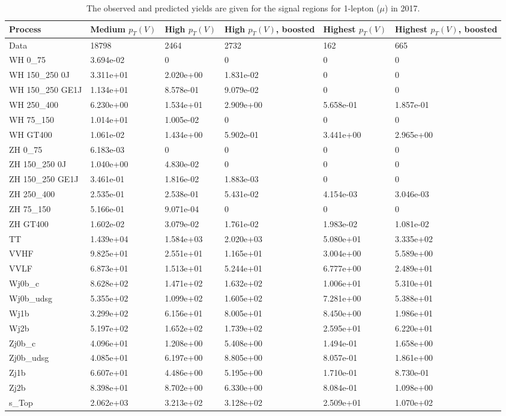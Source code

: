 \begin{table}
\centering
\caption[2017 1-lepton ($\mu$) signal selection yields]{
                  The observed and predicted yields are given for the
                  signal regions for 1-lepton ($\mu$) in 2017.
                  }
{\footnotesize
\begin{tabularx}{\textwidth}{|X|X|X|X|X|X|}
\hline
Process & Medium $p_{T}(V)$ & High $p_{T}(V)$ & High $p_{T}(V)$, boosted & Highest $p_{T}(V)$ & Highest $p_{T}(V)$, boosted \\
\hline
Data & 18798 & 2464 & 2732 & 162 & 665 \\
\hline
WH 0\_75 & 3.694e-02 & 0 & 0 & 0 & 0 \\
WH 150\_250 0J & 3.311e+01 & 2.020e+00 & 1.831e-02 & 0 & 0 \\
WH 150\_250 GE1J & 1.134e+01 & 8.578e-01 & 9.079e-02 & 0 & 0 \\
WH 250\_400 & 6.230e+00 & 1.534e+01 & 2.909e+00 & 5.658e-01 & 1.857e-01 \\
WH 75\_150 & 1.014e+01 & 1.005e-02 & 0 & 0 & 0 \\
WH GT400 & 1.061e-02 & 1.434e+00 & 5.902e-01 & 3.441e+00 & 2.965e+00 \\
ZH 0\_75 & 6.183e-03 & 0 & 0 & 0 & 0 \\
ZH 150\_250 0J & 1.040e+00 & 4.830e-02 & 0 & 0 & 0 \\
ZH 150\_250 GE1J & 3.461e-01 & 1.816e-02 & 1.883e-03 & 0 & 0 \\
ZH 250\_400 & 2.535e-01 & 2.538e-01 & 5.431e-02 & 4.154e-03 & 3.046e-03 \\
ZH 75\_150 & 5.166e-01 & 9.071e-04 & 0 & 0 & 0 \\
ZH GT400 & 1.602e-02 & 3.079e-02 & 1.761e-02 & 1.983e-02 & 1.081e-02 \\
\hline
TT & 1.439e+04 & 1.584e+03 & 2.020e+03 & 5.080e+01 & 3.335e+02 \\
VVHF & 9.825e+01 & 2.551e+01 & 1.165e+01 & 3.004e+00 & 5.589e+00 \\
VVLF & 6.873e+01 & 1.513e+01 & 5.244e+01 & 6.777e+00 & 2.489e+01 \\
Wj0b\_c & 8.628e+02 & 1.471e+02 & 1.632e+02 & 1.006e+01 & 5.310e+01 \\
Wj0b\_udsg & 5.355e+02 & 1.099e+02 & 1.605e+02 & 7.281e+00 & 5.388e+01 \\
Wj1b & 3.299e+02 & 6.156e+01 & 8.005e+01 & 8.450e+00 & 1.986e+01 \\
Wj2b & 5.197e+02 & 1.652e+02 & 1.739e+02 & 2.595e+01 & 6.220e+01 \\
Zj0b\_c & 4.096e+01 & 1.208e+00 & 5.408e+00 & 1.494e-01 & 1.658e+00 \\
Zj0b\_udsg & 4.085e+01 & 6.197e+00 & 8.805e+00 & 8.057e-01 & 1.861e+00 \\
Zj1b & 6.607e+01 & 4.486e+00 & 5.195e+00 & 1.710e-01 & 8.730e-01 \\
Zj2b & 8.398e+01 & 8.702e+00 & 6.330e+00 & 8.084e-01 & 1.098e+00 \\
s\_Top & 2.062e+03 & 3.213e+02 & 3.128e+02 & 2.509e+01 & 1.070e+02 \\
\hline
\end{tabularx}
}
\label{tab:sr-Wmn-2017}
\end{table}

